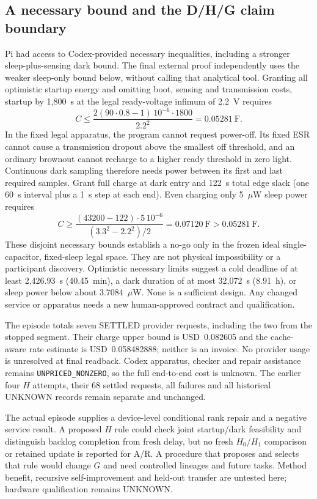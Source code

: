 \subsection{A necessary bound and the D/H/G claim boundary}
Pi had access to Codex-provided necessary inequalities, including a stronger
sleep-plus-sensing dark bound. The final external proof independently uses the
weaker sleep-only bound below, without calling that analytical tool. Granting
all optimistic startup energy and omitting boot, sensing and transmission costs,
startup by 1,800~s at the legal ready-voltage infimum of 2.2~V requires
\[
C \leq \frac{2(90\cdot0.8-1)\,10^{-6}\cdot1800}{2.2^2}
  = 0.05281\ \mathrm{F}.
\]
In the fixed legal apparatus, the program cannot request power-off. Its fixed
ESR cannot cause a transmission dropout above the smallest off threshold, and
an ordinary brownout cannot recharge to a higher ready threshold in zero light.
Continuous dark sampling therefore needs power between its first and last
required samples. Grant full charge at dark entry and 122~s total edge slack
(one 60~s interval plus a 1~s step at each end). Even charging only 5~$\mu$W
sleep power requires
\[
C \geq \frac{(43200-122)\cdot5\,10^{-6}}
                   {(3.3^2-2.2^2)/2}
  = 0.07120\ \mathrm{F} > 0.05281\ \mathrm{F}.
\]
These disjoint necessary bounds establish a no-go only in the frozen ideal
single-capacitor, fixed-sleep legal space. They are not physical impossibility
or a participant discovery. Optimistic necessary limits suggest a cold deadline
of at least 2,426.93~s (40.45~min), a dark duration of at most 32,072~s (8.91~h),
or sleep power below about 3.7084~$\mu$W. None is a sufficient design. Any changed
service or apparatus needs a new human-approved contract and qualification.

The episode totals seven SETTLED provider requests, including the two from the
stopped segment. Their charge upper bound is USD~0.082605 and the cache-aware
rate estimate is USD~0.058482888; neither is an invoice. No provider usage is
unresolved at final readback. Codex apparatus, checker and repair assistance
remains \texttt{UNPRICED\_NONZERO}, so the full end-to-end cost is unknown.
The earlier four $H$ attempts, their 68 settled requests, all failures and all
historical UNKNOWN records remain separate and unchanged.

The actual episode supplies a device-level conditional rank repair and a
negative service result. A proposed $H$ rule could check joint startup/dark
feasibility and distinguish backlog completion from fresh delay, but no fresh
$H_0/H_1$ comparison or retained update is reported for A/R. A procedure that
proposes and selects that rule would change $G$ and need controlled lineages
and future tasks. Method benefit, recursive self-improvement and held-out
transfer are untested here; hardware qualification remains UNKNOWN.
